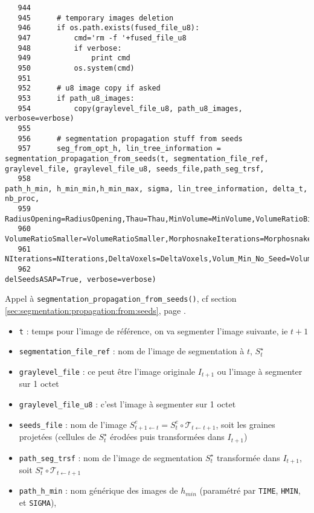\documentclass{article}
\def \mycolor {red}
\begin{document}
\begin{verbatim}
   944	
   945	    # temporary images deletion
   946	    if os.path.exists(fused_file_u8):
   947	        cmd='rm -f '+fused_file_u8
   948	        if verbose:
   949	            print cmd
   950	        os.system(cmd)
   951	
   952	    # u8 image copy if asked
   953	    if path_u8_images:
   954	        copy(graylevel_file_u8, path_u8_images, verbose=verbose)
   955	
   956	    # segmentation propagation stuff from seeds
   957	    seg_from_opt_h, lin_tree_information = segmentation_propagation_from_seeds(t, segmentation_file_ref, graylevel_file, graylevel_file_u8, seeds_file,path_seg_trsf, 
   958	                                                                               path_h_min, h_min_min,h_min_max, sigma, lin_tree_information, delta_t, nb_proc,
   959	                                                                               RadiusOpening=RadiusOpening,Thau=Thau,MinVolume=MinVolume,VolumeRatioBigger=VolumeRatioBigger,
   960	                                                                               VolumeRatioSmaller=VolumeRatioSmaller,MorphosnakeIterations=MorphosnakeIterations,
   961	                                                                               NIterations=NIterations,DeltaVoxels=DeltaVoxels,Volum_Min_No_Seed=Volum_Min_No_Seed, 
   962	                                                                               delSeedsASAP=True, verbose=verbose)
\end{verbatim} 
\color{\mycolor}
Appel \`a \texttt{segmentation\_propagation\_from\_seeds()}, cf section \ref{sec:segmentation:propagation:from:seeds}, page \pageref{sec:segmentation:propagation:from:seeds}.
\begin{itemize}
\itemsep -0.5ex
\item \verb|t| : temps pour l'image de r\'ef\'erence, on va segmenter l'image suivante, ie $t+1$
\item \verb|segmentation_file_ref| : nom de l'image de segmentation \`a $t$, $S^{\star}_t$
\item \verb|graylevel_file| : ce peut \^etre l'image originale $I_{t+1}$ ou  l'image \`a segmenter sur 1 octet
\item \verb|graylevel_file_u8| : c'est l'image \`a segmenter sur 1 octet
\item \verb|seeds_file| : nom de l'image $S^e_{t+1 \leftarrow t} = S^e_t \circ \mathcal{T}_{t \leftarrow t+1}$, soit les graines projet\'ees (cellules de $S^{\star}_t$ \'erod\'ees puis transform\'ees dans $I_{t+1}$)
\item \verb|path_seg_trsf| : nom de l'image de segmentation $S^{\star}_t$ transform\'ee dans $I_{t+1}$, soit
$S^{\star}_t \circ \mathcal{T}_{t \leftarrow t+1}$
\item \verb|path_h_min| : nom g\'en\'erique des images de $h_{min}$ (param\'etr\'e par \verb|TIME|, \verb|HMIN|, et \verb|SIGMA|),
\end{itemize}
\end{document}
